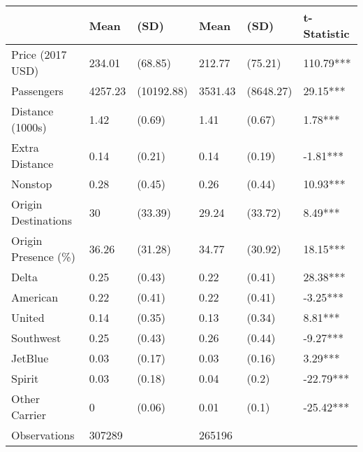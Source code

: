 
\begin{tabular}[t]{llllll}
\toprule
 & Mean & (SD) & Mean & (SD) & t-Statistic\\
\midrule
Price (2017 USD) & 234.01 & (68.85) & 212.77 & (75.21) & 110.79***\\
Passengers & 4257.23 & (10192.88) & 3531.43 & (8648.27) & 29.15***\\
Distance (1000s) & 1.42 & (0.69) & 1.41 & (0.67) & 1.78***\\
Extra Distance & 0.14 & (0.21) & 0.14 & (0.19) & -1.81***\\
Nonstop & 0.28 & (0.45) & 0.26 & (0.44) & 10.93***\\
\addlinespace
Origin Destinations & 30 & (33.39) & 29.24 & (33.72) & 8.49***\\
Origin Presence (\%) & 36.26 & (31.28) & 34.77 & (30.92) & 18.15***\\
Delta & 0.25 & (0.43) & 0.22 & (0.41) & 28.38***\\
American & 0.22 & (0.41) & 0.22 & (0.41) & -3.25***\\
United & 0.14 & (0.35) & 0.13 & (0.34) & 8.81***\\
\addlinespace
Southwest & 0.25 & (0.43) & 0.26 & (0.44) & -9.27***\\
JetBlue & 0.03 & (0.17) & 0.03 & (0.16) & 3.29***\\
Spirit & 0.03 & (0.18) & 0.04 & (0.2) & -22.79***\\
Other Carrier & 0 & (0.06) & 0.01 & (0.1) & -25.42***\\
Observations & 307289 &  & 265196 &  & \\
\bottomrule
\end{tabular}
